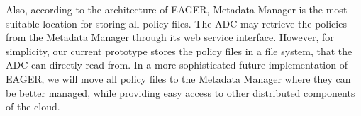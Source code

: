 Also, according to the architecture of EAGER, Metadata Manager is the most suitable
location for storing all policy files. The ADC may retrieve the policies from the Metadata
Manager through its web service interface. However, for simplicity, our current prototype stores
the policy files in a file system, that the ADC can directly read from. In a more sophisticated
future implementation of EAGER, we will move all policy files to the Metadata Manager
where they can be better managed, while providing easy access to other distributed
components of the cloud.

